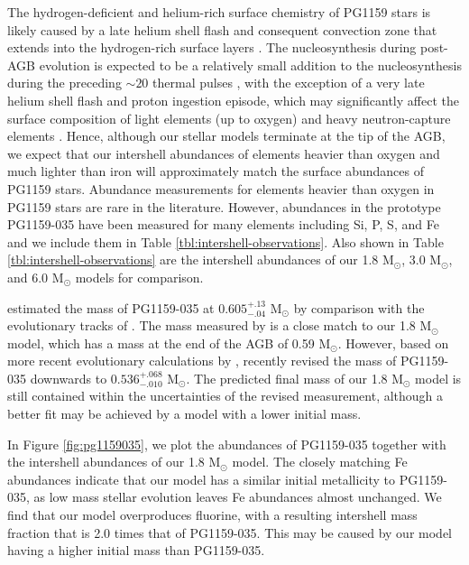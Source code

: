 The hydrogen-deficient and helium-rich surface chemistry of PG1159 stars is likely caused by a late helium shell flash and consequent convection zone that extends into the hydrogen-rich surface layers \citep{Schoenberner:1979vv,Iben:1983hc,Herwig:1999uf}. The nucleosynthesis during post-AGB evolution is expected to be a relatively small addition to the nucleosynthesis during the preceding $\sim 20$ thermal pulses \citep{Herwig:1999uf}, with the exception of a very late helium shell flash and proton ingestion episode, which may significantly affect the surface composition of light elements (up to oxygen) and heavy neutron-capture elements \citep{Herwig:2011dj,Stancliffe:2011dw}. Hence, although our stellar models terminate at the tip of the AGB, we expect that our intershell abundances of elements heavier than oxygen and much lighter than iron will approximately match the surface abundances of PG1159 stars. Abundance measurements for elements heavier than oxygen in PG1159 stars are rare in the literature. However, abundances in the prototype PG1159-035 have been measured for many elements including Si, P, S, and Fe \citep{Jahn:2007ip,Werner:2011bl} and we include them in Table \ref{tbl:intershell-observations}. Also shown in Table \ref{tbl:intershell-observations} are the intershell abundances of our 1.8 M$_\odot$, 3.0 M$_\odot$, and 6.0 M$_\odot$ models for comparison.

\citet{Werner:1991tn} estimated the mass of PG1159-035 at $0.605^{+.13}_{-.04}$ M$_\odot$ by comparison with the evolutionary tracks of \citet{Schoenberner:1979vv}. The mass measured by \citet{Werner:1991tn} is a close match to our 1.8 M$_\odot$ model, which has a mass at the end of the AGB of 0.59 M$_\odot$. However, based on more recent evolutionary calculations by \citet{MillerBertolami:2006ko}, \citet{Werner:2011bl} recently revised the mass of PG1159-035 downwards to $0.536^{+.068}_{-.010}$ M$_\odot$. The predicted final mass of our 1.8 M$_\odot$ model is still contained within the uncertainties of the revised measurement, although a better fit may be achieved by a model with a lower initial mass.

In Figure \ref{fig:pg1159035}, we plot the abundances of PG1159-035 together with the intershell abundances of our 1.8 M$_\odot$ model. The closely matching Fe abundances indicate that our model has a similar initial metallicity to PG1159-035, as low mass stellar evolution leaves Fe abundances almost unchanged. We find that our model overproduces fluorine, with a resulting intershell mass fraction that is 2.0 times that of PG1159-035. This may be caused by our model having a higher initial mass than PG1159-035.

